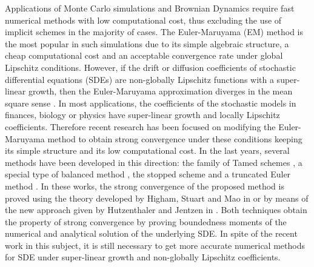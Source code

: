 

	Applications of Monte Carlo simulations \cite{Glasserman2004,Giles2008} and  Brownian Dynamics \cite{Cruz2012}
 require  fast numerical methods with low computational cost, thus excluding the use of 
 implicit schemes in the majority of cases. The Euler-Maruyama (EM) method is the most popular in such  
 simulations due to its simple algebraic structure, a cheap computational cost and an acceptable convergence rate 
 under global Lipschitz conditions.  However, if the drift or diffusion coefficients of stochastic 
 differential equations (SDEs) are non-globally Lipschitz functions with a super-linear growth, then the Euler-Maruyama approximation 
 diverges  in the mean square sense \cite{Hutzenthaler2009, Hutzenthaler2012b}. 
In most applications, the coefficients of the stochastic  models in finances, biology or physics 
have super-linear growth and locally Lipschitz coefficients. Therefore recent research has been 
focused on modifying the Euler-Maruyama method to obtain strong convergence  under these conditions keeping
 its simple structure and  its low computational cost. In the last years, 
 several methods have been developed in this direction:  the family of  Tamed schemes
\cite{Hutzenthaler2012a, Wang2011, Zong2014,Hutzenthaler2015,Sabanis2015}, 
a special type of balanced method \cite{Tretyakov2013},  the stopped scheme \cite{Liu2013a} and 
a truncated Euler method  \cite{Mao2015}.  In these works, the strong convergence of the proposed method
is proved using the theory developed by Higham, Stuart and 
Mao in \cite{Higham2002b} or by means of  the new approach given by  Hutzenthaler and Jentzen in \cite{Hutzenthaler2015}.
Both techniques obtain the property of  strong convergence by proving boundedness moments of the numerical and 
analytical solution of the underlying SDE. In spite of the recent work in this subject,  it is still necessary
to get more accurate numerical methods for SDE under super-linear growth and 
non-globally Lipschitz coefficients.

